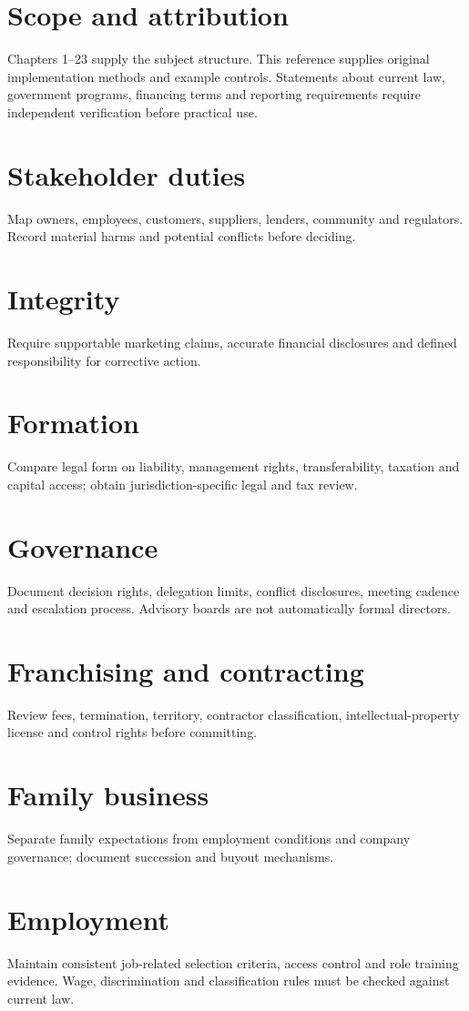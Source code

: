 \documentclass[11pt]{article}
\begin{document}
\SuiteOpen\tableofcontents
\section{Scope and attribution}
Chapters 1--23 supply the subject structure. This reference supplies original implementation methods and example controls. Statements about current law, government programs, financing terms and reporting requirements require independent verification before practical use.
\section{Stakeholder duties}
Map owners, employees, customers, suppliers, lenders, community and regulators. Record material harms and potential conflicts before deciding.
\section{Integrity}
Require supportable marketing claims, accurate financial disclosures and defined responsibility for corrective action.
\section{Formation}
Compare legal form on liability, management rights, transferability, taxation and capital access; obtain jurisdiction-specific legal and tax review.
\section{Governance}
Document decision rights, delegation limits, conflict disclosures, meeting cadence and escalation process. Advisory boards are not automatically formal directors.
\section{Franchising and contracting}
Review fees, termination, territory, contractor classification, intellectual-property license and control rights before committing.
\section{Family business}
Separate family expectations from employment conditions and company governance; document succession and buyout mechanisms.
\section{Employment}
Maintain consistent job-related selection criteria, access control and role training evidence. Wage, discrimination and classification rules must be checked against current law.
\end{document}
